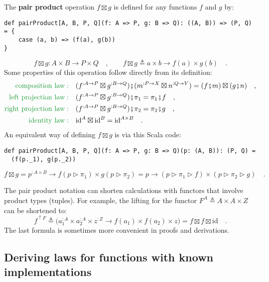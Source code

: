 The \textbf{pair product}
operation $f\boxtimes g$ is defined for any functions $f$ and $g$
by:
\begin{lstlisting}
def pairProduct[A, B, P, Q](f: A => P, g: B => Q): ((A, B)) => (P, Q) = {
    case (a, b) => (f(a), g(b))
}
\end{lstlisting}
\[
f\boxtimes g:A\times B\rightarrow P\times Q\quad,\quad\quad f\boxtimes g\triangleq a\times b\rightarrow f(a)\times g(b)\quad.
\]
Some  properties of this operation follow directly from its definition:
\begin{align}
{\color{greenunder}\text{composition law}:}\quad & (f^{:A\rightarrow P}\boxtimes g^{:B\rightarrow Q})\bef(m^{:P\rightarrow X}\boxtimes n^{:Q\rightarrow Y})=(f\bef m)\boxtimes(g\bef n)\quad,\label{eq:pair-product-composition-law}\\
{\color{greenunder}\text{left projection law}:}\quad & (f^{:A\rightarrow P}\boxtimes g^{:B\rightarrow Q})\bef\pi_{1}=\pi_{1}\bef f\quad,\label{eq:pair-product-left-projection-law}\\
{\color{greenunder}\text{right projection law}:}\quad & (f^{:A\rightarrow P}\boxtimes g^{:B\rightarrow Q})\bef\pi_{2}=\pi_{2}\bef g\quad,\label{eq:pair-product-right-projection-law}\\
{\color{greenunder}\text{identity law}:}\quad & \text{id}^{A}\boxtimes\text{id}^{B}=\text{id}^{A\times B}\quad.\nonumber 
\end{align}
An equivalent way of defining $f\boxtimes g$ is via this Scala code:
\begin{lstlisting}
def pairProduct[A, B, P, Q](f: A => P, g: B => Q)(p: (A, B)): (P, Q) =
  (f(p._1), g(p._2))
\end{lstlisting}
\[
f\boxtimes g=p^{:A\times B}\rightarrow f(p\triangleright\pi_{1})\times g(p\triangleright\pi_{2})=p\rightarrow(p\triangleright\pi_{1}\triangleright f)\times(p\triangleright\pi_{2}\triangleright g)\quad.
\]

The pair product notation can shorten calculations with functors that
involve product types (tuples). For example, the lifting for the functor
$F^{A}\triangleq A\times A\times Z$ can be shortened to:
\[
f^{\uparrow F}\triangleq\big(a_{1}^{:A}\times a_{2}^{:A}\times z^{:Z}\rightarrow f(a_{1})\times f(a_{2})\times z\big)=f\boxtimes f\boxtimes\text{id}\quad.
\]
The last formula is sometimes more convenient in proofs and derivations. 

\subsection{Deriving laws for functions with known implementations\label{subsec:Deriving-laws-for-functions-}}

